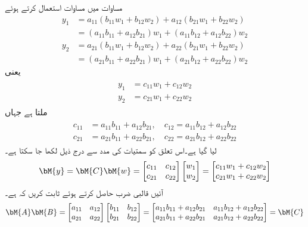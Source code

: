 مساوات  میں مساوات  استعمال کرتے ہوئے
\begin{align*}
y_1&=a_{11}(b_{11}w_1+b_{12}w_2)+a_{12}(b_{21}w_1+b_{22}w_2)\\
&=(a_{11}b_{11}+a_{12}b_{21})w_1+(a_{11}b_{12}+a_{12}b_{22})w_2\\
y_2&=a_{21}(b_{11}w_1+b_{12}w_2)+a_{22}(b_{21}w_1+b_{22}w_2)\\
&=(a_{21}b_{11}+a_{22}b_{21})w_1+(a_{21}b_{12}+a_{22}b_{22})w_2
\end{align*}
یعنی
\begin{gather}
\begin{aligned}
y_1&=c_{11}w_1+c_{12}w_2\\
y_2&=c_{21}w_1+c_{22}w_2
\end{aligned}
\end{gather}
ملتا ہے جہاں
\begin{gather}
\begin{aligned}
c_{11}&=a_{11}b_{11}+a_{12}b_{21}, \quad c_{12}=a_{11}b_{12}+a_{12}b_{22}\\
c_{21}&=a_{21}b_{11}+a_{22}b_{21},\quad c_{22}=a_{21}b_{12}+a_{22}b_{22}
\end{aligned}
\end{gather}
لیا گیا ہے۔اس تعلق کو سمتیات کی مدد سے درج ذیل لکھا جا سکتا ہے۔
\begin{align}
\bM{y}=\bM{C}\bM{w}=\begin{bmatrix}c_{11} & c_{12}\\ c_{21}&c_{22}  \end{bmatrix}\begin{bmatrix}w_1\\w_2  \end{bmatrix}=
\begin{bmatrix} c_{11}w_1+c_{12}w_2\\ c_{21}w_1+c_{22}w_2 \end{bmatrix}
\end{align}
آئیں قالبی ضرب  حاصل کرتے ہوئے ثابت کریں کہ  ہے۔
\begin{align}\label{مساوات_الجبرا_خطی_تعلق_ٹ}
\bM{A}\bM{B}=\begin{bmatrix}a_{11}& a_{12}\\a_{21}& a_{22}  \end{bmatrix}\begin{bmatrix}b_{11} & b_{12}\\ b_{21} & b_{22}  \end{bmatrix}
=\begin{bmatrix}a_{11}b_{11}+a_{12}b_{21} &a_{11}b_{12}+a_{12}b_{22}\\  a_{21}b_{11}+a_{22}b_{21} & a_{21}b_{12}+a_{22}b_{22} \end{bmatrix}=\bM{C}
\end{align}
